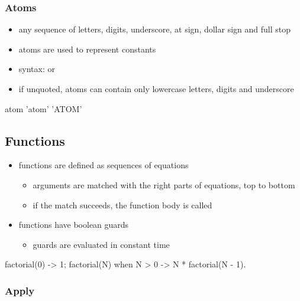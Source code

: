 \documentclass[a4paper,landscape,10pt]{article}
\begin{document}
\begin{multicols*}{2}
  \subsubsection{Atoms}
  \label{sec:erlang-atoms}

  \begin{itemize}
    \item any sequence of letters, digits, underscore, at sign, dollar sign and full stop
    \item atoms are used to represent constants
    \item syntax:  or 
    \item if unquoted, atoms can contain only lowercase letters, digits and underscore
  \end{itemize}

  \begin{erlang}
atom   %
'atom' %
'ATOM' %
\end{erlang}

  \breakcolumn

  \subsection{Functions}

  \begin{itemize}
    \item functions are defined as sequences of equations
          \begin{itemize}
            \item arguments are matched with the right parts of equations, top to bottom
            \item if the match succeeds, the function body is called
          \end{itemize}
    \item functions have boolean guards 
          \begin{itemize}
            \item guards are evaluated in constant time
          \end{itemize}
  \end{itemize}

  \begin{erlang}
factorial(0) -> 1;
factorial(N) when N > 0 -> N * factorial(N - 1).
\end{erlang}

  \subsubsection{Apply}


\end{multicols*}
\end{document}
